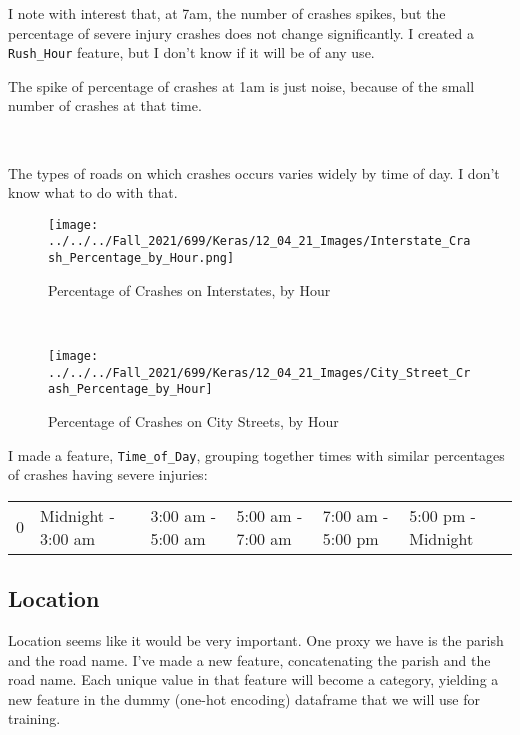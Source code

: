 I note with interest that, at 7am, the number of crashes spikes, but the percentage of severe injury crashes does not change significantly.  I created a \verb|Rush_Hour| feature, but I don't know if it will be of any use.  


The spike of percentage of crashes at 1am is just noise, because of the small number of crashes at that time.    


\

The types of roads on which crashes occurs varies widely by time of day.  I don't know what to do with that.  


\begin{figure}[h!]
\centering
\begin{minipage}{.45\textwidth}
  \centering
  \texttt{[image: ../../../Fall\_2021/699/Keras/12\_04\_21\_Images/Interstate\_Crash\_Percentage\_by\_Hour.png]}
  \caption{Percentage of Crashes on Interstates, by Hour}
  \label{fig:test1}
\end{minipage}%
\begin{minipage}{0.08\textwidth}
\
\end{minipage}
\begin{minipage}{.45\textwidth}
  \centering
  \texttt{[image: ../../../Fall\_2021/699/Keras/12\_04\_21\_Images/City\_Street\_Crash\_Percentage\_by\_Hour]}
  \caption{Percentage of Crashes on City Streets, by Hour}
  \label{fig:test2}
\end{minipage}
\end{figure}


I made a feature, \verb|Time_of_Day|, grouping together times with similar percentages of crashes having severe injuries:

\begin{center}
\begin{tabular}{rl}
	0 & Midnight - 3:00 am & 3:00 am - 5:00 am & 5:00 am - 7:00 am  & 7:00 am - 5:00 pm  & 5:00 pm - Midnight \cr
\end{tabular}
\end{center}


\subsection{Location}
	Location seems like it would be very important.  One proxy we have is the parish and the road name.  I've made a new feature, concatenating the parish and the road name.  Each unique value in that feature will become a category, yielding a new feature in the dummy (one-hot encoding) dataframe that we will use for training.
	
